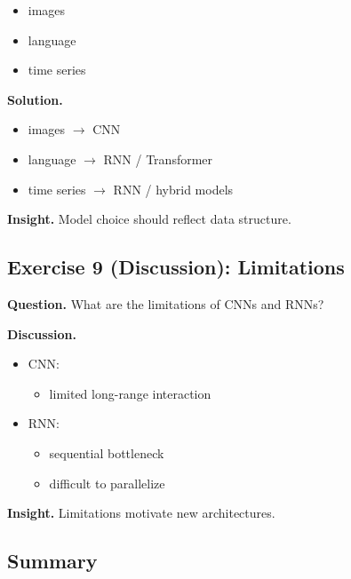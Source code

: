 \begin{itemize}
    \item images
    \item language
    \item time series
\end{itemize}

\medskip

\noindent
\textbf{Solution.}

\begin{itemize}
    \item images $\rightarrow$ CNN
    \item language $\rightarrow$ RNN / Transformer
    \item time series $\rightarrow$ RNN / hybrid models
\end{itemize}

\medskip

\noindent
\textbf{Insight.}  
Model choice should reflect data structure.

\subsection{Exercise 9 (Discussion): Limitations}

\textbf{Question.}  
What are the limitations of CNNs and RNNs?

\medskip

\noindent
\textbf{Discussion.}

\begin{itemize}
    \item CNN:
    \begin{itemize}
        \item limited long-range interaction
    \end{itemize}

    \item RNN:
    \begin{itemize}
        \item sequential bottleneck
        \item difficult to parallelize
    \end{itemize}
\end{itemize}

\medskip

\noindent
\textbf{Insight.}  
Limitations motivate new architectures.

\subsection{Summary}

